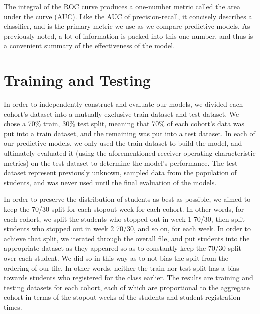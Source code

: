 The integral of the ROC curve produces a one-number metric called the area under the curve (AUC). Like the AUC of precision-recall, it concisely describes a classifier, and is the primary metric we use as we compare predictive models. As previously noted, a lot of information is packed into this one number, and thus is a convenient summary of the effectiveness of the model.

\section{Training and Testing}
In order to independently construct and evaluate our models, we divided each cohort's dataset into a mutually exclusive train dataset and test dataset. We chose a 70\% train, 30\% test split, meaning that 70\% of each cohort's data was put into a train dataset, and the remaining was put into a test dataset. In each of our predictive models, we only used the train dataset to build the model, and ultimately evaluated it (using the aforementioned receiver operating characteristic metrics) on the test dataset to determine the model's performance. The test dataset represent previously unknown, sampled data from the population of students, and was never used until the final evaluation of the models.

In order to preserve the distribution of students as best as possible, we aimed to keep the 70/30 split for each stopout week for each cohort. In other words, for each cohort, we split the students who stopped out in week 1 70/30, then split students who stopped out in week 2 70/30, and so on, for each \sti week. In order to achieve that split, we iterated through the overall file, and put students into the appropriate dataset as they appeared so as to constantly keep the 70/30 split over each student. We did so in this way as to not bias the split from the ordering of our file. In other words, neither the train nor test split has a bias towards students who registered for the class earlier. The results are training and testing datasets for each cohort, each of which are proportional to the aggregate cohort in terms of the stopout weeks of the students and student registration times.

